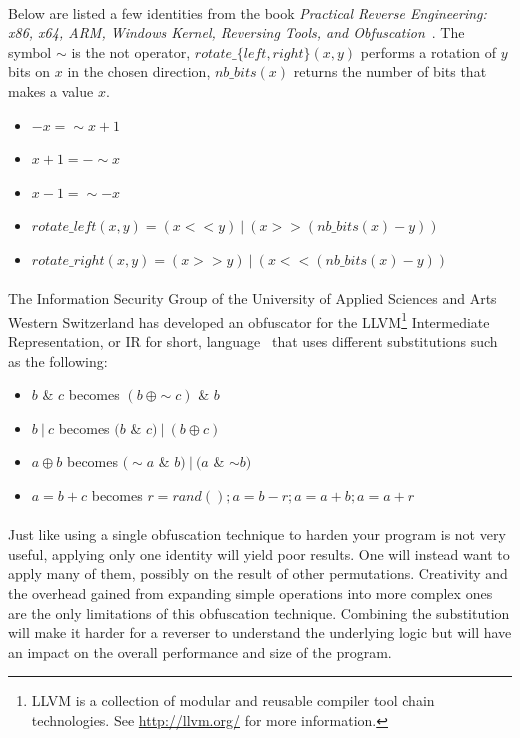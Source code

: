 \paragraph{}
Below are listed a few identities from the book \textit{Practical Reverse Engineering: x86, x64, ARM, Windows Kernel, Reversing Tools, and Obfuscation}~\cite{Dang:2014:PRE:2636663}. The symbol $\sim$ is the not operator, $rotate\_\{left, right\}(x, y)$ performs a rotation of $y$ bits on $x$ in the chosen direction, $nb\_bits(x)$ returns the number of bits that makes a value $x$.
\begin{itemize}
	\item $-x = \sim x + 1$
	\item $x + 1 = - \sim x$
	\item $x-1 = \sim - x$
	\item $rotate\_left(x, y) = (x << y)\ |\ (x >> (nb\_bits(x)-y))$
	\item $rotate\_right(x, y) = (x >> y)\ |\ (x << (nb\_bits(x)-y))$
\end{itemize}

\paragraph{}
The Information Security Group of the University of Applied Sciences and Arts Western Switzerland has developed an obfuscator for the LLVM\footnote{LLVM is a collection of modular and reusable compiler tool chain technologies. See \url{http://llvm.org/} for more information.} Intermediate Representation, or IR for short, language~\cite{ollvm} that uses different substitutions such as the following:
\begin{itemize}
	\item $b$ \& $c$ becomes $(b\ \oplus \sim c)$ \& $b$
	\item $b\ |\ c$ becomes $(b$ \& $c)\ |\ (b \oplus c)$
	\item $a \oplus b$ becomes $(\sim a$ \& $b)\ |\ (a$ \& $ \sim b)$
	\item $a = b + c$ becomes $r = rand (); a = b - r; a = a + b; a = a + r$
\end{itemize} 

\paragraph{}
Just like using a single obfuscation technique to harden your program is not very useful, applying only one identity will yield poor results. One will instead want to apply many of them, possibly on the result of other permutations. Creativity and the overhead gained from expanding simple operations into more complex ones are the only limitations of this obfuscation technique. Combining the substitution will make it harder for a reverser to understand the underlying logic but will have an impact on the overall performance and size of the program.

